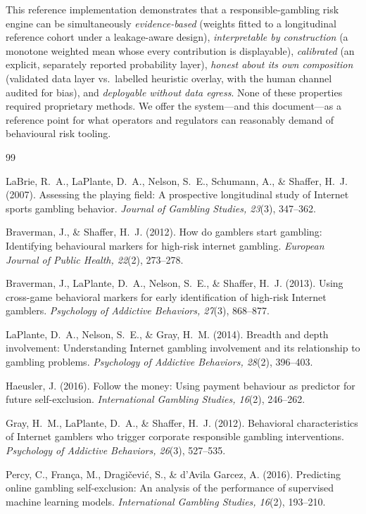 \documentclass[11pt]{article}
\begin{document}
This reference implementation demonstrates that a responsible-gambling risk engine can be
simultaneously \emph{evidence-based} (weights fitted to a longitudinal reference cohort
under a leakage-aware design), \emph{interpretable by construction} (a monotone
weighted mean whose every contribution is displayable), \emph{calibrated} (an explicit,
separately reported probability layer), \emph{honest about its own composition}
(validated data layer vs.\ labelled heuristic overlay, with the human channel audited
for bias), and \emph{deployable without data egress}. None of these properties required
proprietary methods. We offer the system---and this document---as a reference point for
what operators and regulators can reasonably demand of behavioural risk tooling.

\begin{thebibliography}{99}\small

 LaBrie, R.~A., LaPlante, D.~A., Nelson, S.~E., Schumann, A., \&
Shaffer, H.~J. (2007). Assessing the playing field: A prospective longitudinal study of
Internet sports gambling behavior. \emph{Journal of Gambling Studies, 23}(3), 347--362.

 Braverman, J., \& Shaffer, H.~J. (2012). How do gamblers start
gambling: Identifying behavioural markers for high-risk internet gambling.
\emph{European Journal of Public Health, 22}(2), 273--278.

 Braverman, J., LaPlante, D.~A., Nelson, S.~E., \& Shaffer,
H.~J. (2013). Using cross-game behavioral markers for early identification of high-risk
Internet gamblers. \emph{Psychology of Addictive Behaviors, 27}(3), 868--877.

 LaPlante, D.~A., Nelson, S.~E., \& Gray, H.~M. (2014). Breadth
and depth involvement: Understanding Internet gambling involvement and its relationship
to gambling problems. \emph{Psychology of Addictive Behaviors, 28}(2), 396--403.

 Haeusler, J. (2016). Follow the money: Using payment behaviour
as predictor for future self-exclusion. \emph{International Gambling Studies, 16}(2),
246--262.

 Gray, H.~M., LaPlante, D.~A., \& Shaffer, H.~J. (2012). Behavioral
characteristics of Internet gamblers who trigger corporate responsible gambling
interventions. \emph{Psychology of Addictive Behaviors, 26}(3), 527--535.

 Percy, C., Fran\c{c}a, M., Dragi\v{c}evi\'{c}, S., \& d'Avila
Garcez, A. (2016). Predicting online gambling self-exclusion: An analysis of the
performance of supervised machine learning models. \emph{International Gambling
Studies, 16}(2), 193--210.


\end{thebibliography}
\end{document}

